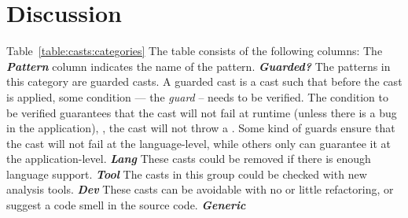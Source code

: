\section{Discussion}
\label{sec:casts:discussion}


\newcommand{\gh}[1]{\emph{\textbf{#1}}}
Table~\ref{table:casts:categories} 
The table consists of the following columns: The \gh{Pattern} column indicates the name of the pattern.
\gh{Guarded?} The patterns in this category are guarded casts.
A guarded cast is a cast such that before the cast is applied,
some condition --- the \emph{guard} -- needs to be verified.
The condition to be verified guarantees that the cast will not fail at runtime (unless there is a bug in the application), \ie,
the cast will not throw a .
Some kind of guards ensure that the cast will not fail at the language-level,
while others only can guarantee it at the application-level.
\gh{Lang} These casts could be removed if there is enough language support.
\gh{Tool} The casts in this group could be checked with new analysis tools.
\gh{Dev} These casts can be avoidable with no or little refactoring,
or suggest a code smell in the source code.
\gh{Generic}

